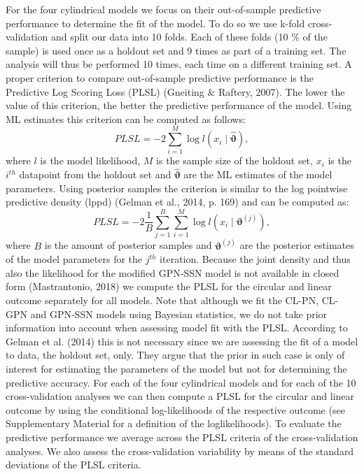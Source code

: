 \documentclass[man]{apa6}
\begin{document}
For the four cylindrical models we focus on their out-of-sample predictive
performance to determine the fit of the model. To do so we use k-fold
cross-validation and split our data into 10 folds. Each of these folds (10 \(\%\)
of the sample) is used once as a holdout set and 9 times as part of a training
set. The analysis will thus be performed 10 times, each time on a different
training set.\newline
\indent A proper criterion to compare out-of-sample predictive performance is
the Predictive Log Scoring Loss (PLSL) (Gneiting \& Raftery, 2007). The lower the
value of this criterion, the better the predictive performance of the model.
Using ML estimates this criterion can be computed as follows:
\begin{equation}\label{PLSLML}
PLSL = -2 \sum_{i = 1}^{M}\log l(x_i \mid \hat{\boldsymbol{\vartheta}}),\nonumber
\end{equation}
\noindent where \(l\) is the model likelihood, \(M\) is the sample size of the
holdout set, \(x_i\) is the \(i^{th}\) datapoint from the holdout set and
\(\hat{\boldsymbol{\vartheta}}\) are the ML estimates of the model parameters.
Using posterior samples the criterion is similar to the log pointwise predictive
density (lppd) (Gelman et al., 2014, p. 169) and can be computed as:
\begin{equation}\label{PLSLBayes}
PLSL = -2 \frac{1}{B} \sum_{j = 1}^{B}\sum_{i = 1}^{M} \log l(x_i \mid \boldsymbol{\vartheta}^{(j)}),\nonumber
\end{equation}
\noindent where \(B\) is the amount of posterior samples and
\(\boldsymbol{\vartheta}^{(j)}\) are the posterior estimates of the model
parameters for the \(j^{th}\) iteration. Because the joint density and thus also
the likelihood for the modified GPN-SSN model is not
available in closed form (Mastrantonio, 2018) we compute the PLSL for the
circular and linear outcome separately for all models. Note that although we fit
the CL-PN, CL-GPN and GPN-SSN models using Bayesian statistics, we do not take
prior information into account when assessing model fit with the PLSL. According
to Gelman et al. (2014) this is not necessary since we are assessing the fit of a model
to data, the holdout set, only. They argue that the prior in such case is only
of interest for estimating the parameters of the model but not for determining
the predictive accuracy.\newline
\indent For each of the four cylindrical models and for each of the 10
cross-validation analyses we can then compute a PLSL for the circular and linear
outcome by using the conditional log-likelihoods of the respective outcome (see
Supplementary Material for a definition of the loglikelihoods). To evaluate the
predictive performance we average across the PLSL criteria of the
cross-validation analyses. We also assess the cross-validation variability by
means of the standard deviations of the PLSL criteria.
\end{document}
